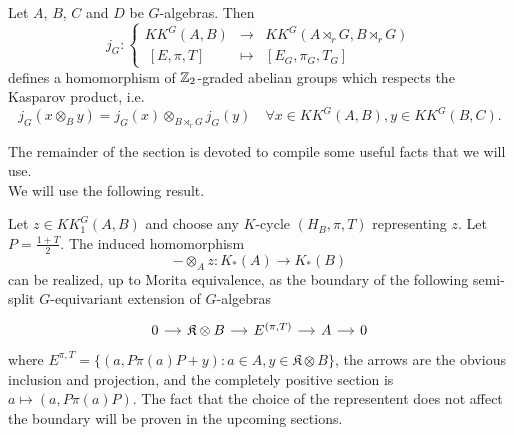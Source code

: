 \begin{prop}\cite{LeGall} Let $A$, $B$, $C$ and $D$ be $G$-algebras. Then 
\[j_G : 
\left\{\begin{array}{rcl} 
KK^G(A,B) & \rightarrow & KK^G(A\rtimes_r G,B\rtimes_r G) \\ 
\ [E,\pi,T] & \mapsto     & [E_G,\pi_G,T_G]
\end{array}\right. \] 
defines a homomorphism of $\mathbb Z_2$-graded abelian groups which respects the Kasparov product, i.e. 
\[j_G(x\otimes_B y) = j_G(x)\otimes_{B\rtimes_r G} j_G(y)\quad \forall x\in KK^G(A,B),y\in KK^G(B,C).\]
\end{prop}

The remainder of the section is devoted to compile some useful facts that we will use.\\

We will use the following result.\cite{blackadar}\cite{CuSk}


\begin{prop}
Let $z\in KK^G_1(A,B)$ and choose any $K$-cycle $(H_B,\pi,T)$ representing $z$. Let $P=\frac{1+T}{2}$. The induced homomorphism 
\[-\otimes_A z : K_*(A)\rightarrow K_*(B)\]
can be realized, up to Morita equivalence, as the boundary of the following semi-split $G$-equivariant extension of $G$-algebras
\[\begin{tikzcd}[column sep = small] 
0 \arrow{r}& \mathfrak K \otimes B \arrow{r} & E^{(\pi,T)} \arrow{r} & A \arrow{r} & 0\end{tikzcd}\]
where $E^{\pi,T}=\{(a,P\pi(a)P +y) : a\in A , y\in \mathfrak K \otimes B\}$, the arrows are the obvious inclusion and projection, and the completely positive section is $a\mapsto (a, P \pi(a) P)$. The fact that the choice of the representent does not affect the boundary will be proven in the upcoming sections. 
\end{prop}

